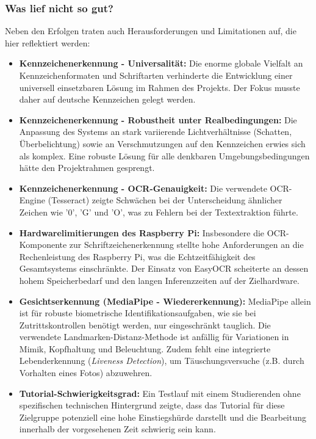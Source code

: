 \subsubsection{Was lief nicht so gut?}
Neben den Erfolgen traten auch Herausforderungen und Limitationen auf, die hier reflektiert werden:
\begin{itemize}
    \item \textbf{Kennzeichenerkennung - Universalität:} Die enorme globale Vielfalt an Kennzeichenformaten und Schriftarten verhinderte die Entwicklung einer universell einsetzbaren Lösung im Rahmen des Projekts. Der Fokus musste daher auf deutsche Kennzeichen gelegt werden.
    \item \textbf{Kennzeichenerkennung - Robustheit unter Realbedingungen:} Die Anpassung des Systems an stark variierende Lichtverhältnisse (Schatten, Überbelichtung) sowie an Verschmutzungen auf den Kennzeichen erwies sich als komplex. Eine robuste Lösung für alle denkbaren Umgebungsbedingungen hätte den Projektrahmen gesprengt.
    \item \textbf{Kennzeichenerkennung - OCR-Genauigkeit:} Die verwendete OCR-Engine (Tesseract) zeigte Schwächen bei der Unterscheidung ähnlicher Zeichen wie '0', 'G' und 'O', was zu Fehlern bei der Textextraktion führte.
    \item \textbf{Hardwarelimitierungen des Raspberry Pi:} Insbesondere die OCR-Komponente zur Schriftzeichenerkennung stellte hohe Anforderungen an die Rechenleistung des Raspberry Pi, was die Echtzeitfähigkeit des Gesamtsystems einschränkte. Der Einsatz von EasyOCR scheiterte an dessen hohem Speicherbedarf und den langen Inferenzzeiten auf der Zielhardware.
    \item \textbf{Gesichtserkennung (MediaPipe - Wiedererkennung):} MediaPipe allein ist für robuste biometrische Identifikationsaufgaben, wie sie bei Zutrittskontrollen benötigt werden, nur eingeschränkt tauglich. Die verwendete Landmarken-Distanz-Methode ist anfällig für Variationen in Mimik, Kopfhaltung und Beleuchtung. Zudem fehlt eine integrierte Lebenderkennung (\textit{Liveness Detection}), um Täuschungsversuche (z.B. durch Vorhalten eines Fotos) abzuwehren.
    \item \textbf{Tutorial-Schwierigkeitsgrad:} Ein Testlauf mit einem Studierenden ohne spezifischen technischen Hintergrund zeigte, dass das Tutorial für diese Zielgruppe potenziell eine hohe Einstiegshürde darstellt und die Bearbeitung innerhalb der vorgesehenen Zeit schwierig sein kann.
\end{itemize}


